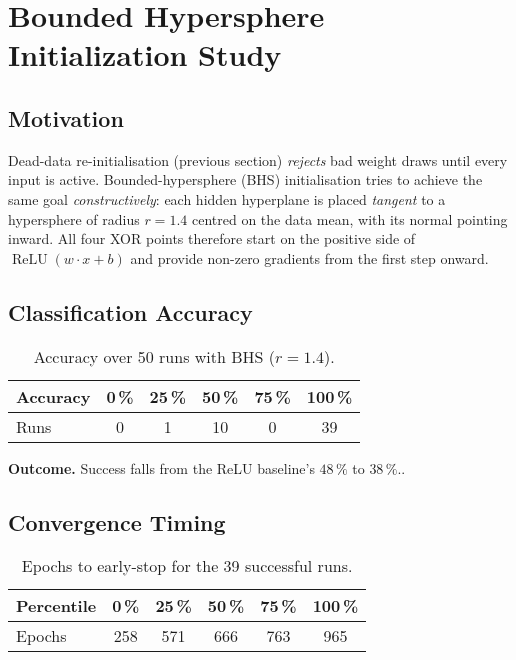 \section{Bounded Hypersphere Initialization Study}
\label{sec:relu1-bounded-hypersphere}

\subsection*{Motivation}
Dead-data re-initialisation (previous section) \emph{rejects} bad weight
draws until every input is active.  
Bounded-hypersphere (BHS) initialisation tries to achieve the same goal
\emph{constructively}: each hidden hyperplane is placed
\emph{tangent} to a hypersphere of radius $r=1.4$
centred on the data mean, with its normal pointing inward.
All four XOR points therefore start on the positive side of
\(\operatorname{ReLU}(w\!\cdot\!x+b)\) and provide non-zero gradients
from the first step onward.

\subsection*{Classification Accuracy}

\begin{table}[h]
\centering
\caption{Accuracy over 50 runs with BHS ($r=1.4$).}
\label{tab:relu1-bhs-accuracy}
\begin{tabular}{lccccc}
\toprule
Accuracy & 0\,\% & 25\,\% & 50\,\% & 75\,\% & 100\,\% \\
\midrule
Runs & 0 & 1 & 10 & 0 & 39 \\
\bottomrule
\end{tabular}
\end{table}

\textbf{Outcome.}
Success falls from the ReLU baseline's $48\,\%$ to $38\,\%$..

\subsection*{Convergence Timing}

\begin{table}[h]
\centering
\caption{Epochs to early-stop for the 39 successful runs.}
\label{tab:relu1-bhs-epochs}
\begin{tabular}{lccccc}
\toprule
Percentile & 0\,\% & 25\,\% & 50\,\% & 75\,\% & 100\,\% \\
\midrule
Epochs & 258 & 571 & 666 & 763 & 965\\
\bottomrule
\end{tabular}
\end{table}

